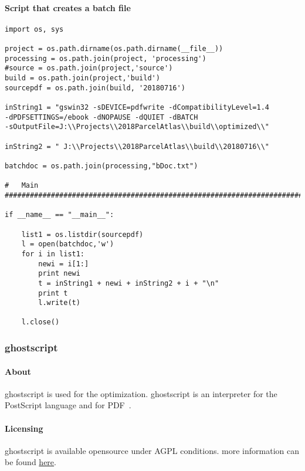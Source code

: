\documentclass[class=article , crop=false, titlepage, twoside, multi={itemize, figure, verbatim}, float=false]{standalone}
\begin{document}
\paragraph*{Script that creates a batch file}
\begin{verbatim}
import os, sys

project = os.path.dirname(os.path.dirname(__file__))
processing = os.path.join(project, 'processing')
#source = os.path.join(project,'source')
build = os.path.join(project,'build')
sourcepdf = os.path.join(build, '20180716')

inString1 = "gswin32 -sDEVICE=pdfwrite -dCompatibilityLevel=1.4
-dPDFSETTINGS=/ebook -dNOPAUSE -dQUIET -dBATCH
-sOutputFile=J:\\Projects\\2018ParcelAtlas\\build\\optimized\\"

inString2 = " J:\\Projects\\2018ParcelAtlas\\build\\20180716\\"

batchdoc = os.path.join(processing,"bDoc.txt")

#   Main
################################################################################

if __name__ == "__main__":

    list1 = os.listdir(sourcepdf)
    l = open(batchdoc,'w')
    for i in list1:
        newi = i[1:]
        print newi
        t = inString1 + newi + inString2 + i + "\n"
        print t
        l.write(t)

    l.close()

\end{verbatim}

\subsubsection{ghostscript}

\paragraph{About}
ghostscript is used for the optimization. ghostscript is an interpreter for the PostScript language and for PDF~\cite{ghostscript1}.
\paragraph{Licensing}
ghostscript is available opensource under AGPL conditions.  more information can be found \href{https://www.ghostscript.com/license.html}{here}.
\end{document}
